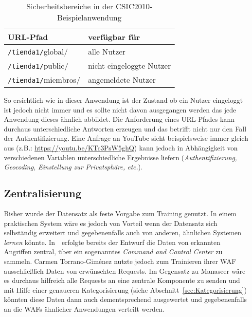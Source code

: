 \begin{table}[h]
  \centering
  \begin{tabular}{lp{7cm}}
    \toprule
    \textbf{URL-Pfad} & \textbf{verfügbar für} \\
    \midrule
    \verb=/tienda1/=\textcolor{bhtBlue}{global}/ & alle Nutzer\\
    \verb=/tienda1/=\textcolor{bhtBlue}{public}/ & nicht eingeloggte Nutzer  \\ 
    \verb=/tienda1/=\textcolor{bhtBlue}{miembros}/ & angemeldete Nutzer  \\
    \bottomrule
  \end{tabular}
  
  \caption{Sicherheitsbereiche in der CSIC2010-Beispielanwendung}
  \label{tab:csicsecarea}
\end{table}

So ersichtlich wie in dieser Anwendung ist der Zustand ob ein Nutzer eingeloggt ist jedoch nicht immer und es sollte nicht davon ausgegangen werden das jede Anwendung dieses ähnlich abbildet. Die Anforderung eines URL-Pfades kann durchaus unterschiedliche Antworten erzeugen und das betrifft nicht nur den Fall der Authentifizierung. Eine Anfrage an YouTube sieht beispielsweise immer gleich aus (z.B.: \url{https://youtu.be/KTc3PsW5ghQ}) kann jedoch in Abhängigkeit von verschiedenen Variablen unterschiedliche Ergebnisse liefern (\emph{Authentifizierung, Geocoding, Einstellung zur Privatsphäre, etc.}).




\subsection{Zentralisierung}
\label{sec:zentralisierungkern}

Bisher wurde der Datensatz als feste Vorgabe zum Training genutzt. In einem praktischen System wäre es jedoch von Vorteil wenn der Datensatz sich selbständig erweitert und gegebenenfalls auch von anderen, ähnlichen Systemen \glqq\emph{lernen}\grqq{} könnte. In~\cite{Manaseer2018}~erfolgte bereits der Entwurf die Daten von erkannten Angriffen zentral, über ein sogenanntes \emph{Command and Control Center} zu sammeln. Carmen Torrano-Giménez nutzte jedoch zum Trainieren ihrer WAF ausschließlich Daten von erwünschten Requests. Im Gegensatz zu Manaseer wäre es durchaus hilfreich alle Requests an eine zentrale Komponente zu senden und mit Hilfe einer genaueren Kategorisierung (siehe Abschnitt~\ref{sec:Kategorisierung}) könnten diese Daten dann auch dementsprechend ausgewertet und gegebenenfalls an die WAFs ähnlicher Anwendungen verteilt werden.


